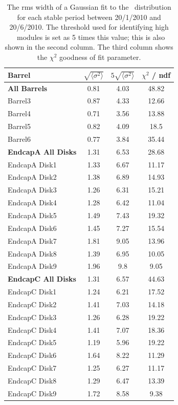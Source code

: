 \begin{table}[h]
 \centering
\begin{tabular}{ l | c | c | c }
\hline\hline
Barrel & $\sqrt{\langle \sigma ^ 2 \rangle }$ & $5\sqrt{\langle \sigma ^ 2 \rangle }$ & $\chi ^2$  / ndf\\
\hline
\textbf{All Barrels} & 0.81 & 4.03 & 48.82 \\
Barrel3 & 0.87 & 4.33 & 12.66 \\
Barrel4 & 0.71 & 3.56 & 13.88 \\
Barrel5 & 0.82 & 4.09 & 18.5 \\
Barrel6 & 0.77 & 3.84 & 35.44 \\
\hline
\textbf{EndcapA All Disks} & 1.31 & 6.53 & 28.68 \\
EndcapA Disk1 & 1.33 & 6.67 & 11.17 \\
EndcapA Disk2 & 1.38 & 6.89 & 14.93 \\
EndcapA Disk3 & 1.26 & 6.31 & 15.21 \\
EndcapA Disk4 & 1.28 & 6.42 & 11.04 \\
EndcapA Disk5 & 1.49 & 7.43 & 19.32 \\
EndcapA Disk6 & 1.45 & 7.27 & 15.54 \\
EndcapA Disk7 & 1.81 & 9.05 & 13.96 \\
EndcapA Disk8 & 1.39 & 6.95 & 10.05 \\
EndcapA Disk9 & 1.96 & 9.8 & 9.05 \\
\hline
\textbf{EndcapC All Disks} & 1.31 & 6.57 & 44.63 \\
EndcapC Disk1 & 1.24 & 6.21 & 17.52 \\
EndcapC Disk2 & 1.41 & 7.03 & 14.18 \\
EndcapC Disk3 & 1.26 & 6.28 & 19.22 \\
EndcapC Disk4 & 1.41 & 7.07 & 18.36 \\
EndcapC Disk5 & 1.19 & 5.96 & 19.22 \\
EndcapC Disk6 & 1.64 & 8.22 & 11.29 \\
EndcapC Disk7 & 1.25 & 6.27 & 11.17 \\
EndcapC Disk8 & 1.29 & 6.47 & 13.39 \\
EndcapC Disk9 & 1.72 & 8.58 & 9.38 \\
\hline\hline
\end{tabular}
\caption{The rms width of a Gaussian fit to the \tdiff\ distribution for each
stable period between 20/1/2010 and 20/6/2010. The threshold used for
identifying high \tdiff\ modules is set as 5 times this value; this is also shown
in the second column. The third column shows the $\chi^2$ goodness of fit
parameter.}
\label{table:tdiff_thresh}
\end{table}

